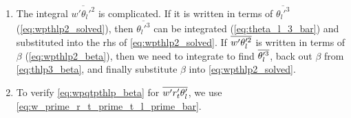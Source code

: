\begin{enumerate}
    \item\label{itm:checkingstep_7}
    The integral $\overline{w'\theta_l'^2}$ is complicated.
    If it is written in terms of $\overline{\theta_l'^3}$ (\cref{eq:wpthlp2_solved}),
    then $\overline{\theta_l'^3}$ can be integrated (\cref{eq:theta_l_3_bar})
    and substituted into the \gls{rhs} of \cref{eq:wpthlp2_solved}.
    If $\overline{w' \theta_l'^2}$ is written in terms of $\beta$ (\cref{eq:wpthlp2_beta}),
    then we need to integrate to find $\overline{\theta_l'^3}$,
    back out $\beta$ from \cref{eq:thlp3_beta},
    and finally substitute $\beta$ into \cref{eq:wpthlp2_solved}.

    \item\label{itm:checkingstep_8}
    To verify \cref{eq:wpqtpthlp_beta} for $\overline{w' r_t' \theta_l'}$,
    we use \cref{eq:w_prime_r_t_prime_t_l_prime_bar}.
\end{enumerate}
